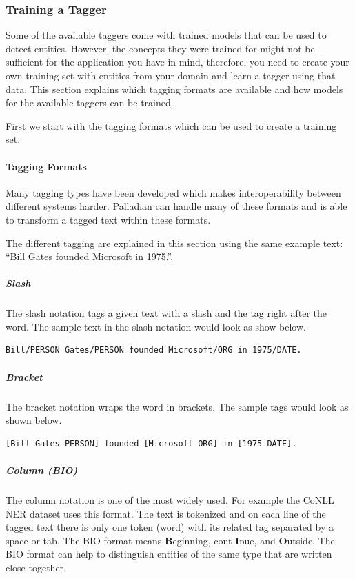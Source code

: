 \documentclass[a4paper,twoside]{book}      %
\begin{document}
\subsubsection{Training a Tagger}

Some of the available taggers come with trained models that can be used to detect entities. However, the concepts they were trained for might not be sufficient for the application you have in mind, therefore, you need to create your own training set with entities from your domain and learn a tagger using that data. This section explains which tagging formats are available and how models for the available taggers can be trained.

First we start with the tagging formats which can be used to create a training set.

\paragraph{Tagging Formats}
Many tagging types have been developed which makes interoperability between different systems harder. Palladian can handle many of these formats and is able to transform a tagged text within these formats. 

The different tagging are explained in this section using the same example text: ``Bill Gates founded Microsoft in 1975.''.

\subparagraph{Slash} The slash notation tags a given text with a slash and the tag right after the word. The sample text in the slash notation would look as show below.

\begin{verbatim}
Bill/PERSON Gates/PERSON founded Microsoft/ORG in 1975/DATE.
\end{verbatim}

\subparagraph{Bracket} The bracket notation wraps the word in brackets. The sample tags would look as shown below.

\begin{verbatim}
[Bill Gates PERSON] founded [Microsoft ORG] in [1975 DATE].
\end{verbatim}

\subparagraph{Column (BIO)} The column notation is one of the most widely used. For example the CoNLL NER dataset uses this format. The text is tokenized and on each line of the tagged text there is only one token (word) with its related tag separated by a space or tab. The BIO format means \textbf{ B}eginning, cont\textbf{ I}nue, and \textbf{ O}utside. The BIO format can help to distinguish entities of the same type that are written close together.
\end{document}
